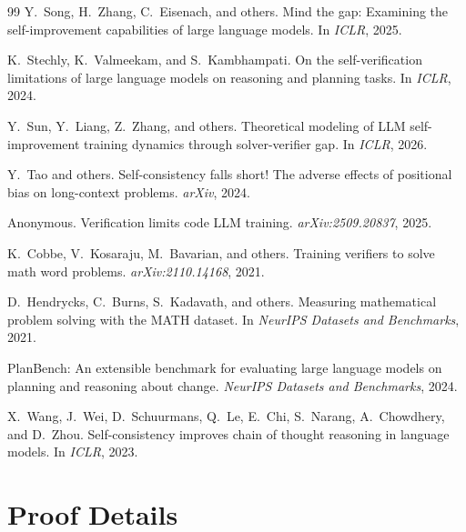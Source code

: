 \documentclass{article}
\theoremstyle{definition}
\theoremstyle{remark}
\begin{document}
\begin{thebibliography}{99}
Y.~Song, H.~Zhang, C.~Eisenach, and others.
\newblock Mind the gap: Examining the self-improvement capabilities of large language models.
\newblock In \emph{ICLR}, 2025.

K.~Stechly, K.~Valmeekam, and S.~Kambhampati.
\newblock On the self-verification limitations of large language models on reasoning and planning tasks.
\newblock In \emph{ICLR}, 2024.

Y.~Sun, Y.~Liang, Z.~Zhang, and others.
\newblock Theoretical modeling of {LLM} self-improvement training dynamics through solver-verifier gap.
\newblock In \emph{ICLR}, 2026.

Y.~Tao and others.
\newblock Self-consistency falls short! {T}he adverse effects of positional bias on long-context problems.
\newblock \emph{arXiv}, 2024.

Anonymous.
\newblock Verification limits code {LLM} training.
\newblock \emph{arXiv:2509.20837}, 2025.

K.~Cobbe, V.~Kosaraju, M.~Bavarian, and others.
\newblock Training verifiers to solve math word problems.
\newblock \emph{arXiv:2110.14168}, 2021.

D.~Hendrycks, C.~Burns, S.~Kadavath, and others.
\newblock Measuring mathematical problem solving with the {MATH} dataset.
\newblock In \emph{NeurIPS Datasets and Benchmarks}, 2021.

PlanBench: An extensible benchmark for evaluating large language models on planning and reasoning about change.
\newblock \emph{NeurIPS Datasets and Benchmarks}, 2024.

X.~Wang, J.~Wei, D.~Schuurmans, Q.~Le, E.~Chi, S.~Narang, A.~Chowdhery, and D.~Zhou.
\newblock Self-consistency improves chain of thought reasoning in language models.
\newblock In \emph{ICLR}, 2023.

\end{thebibliography}

\appendix

\section{Proof Details}
\label{app:proofs}
\end{document}
